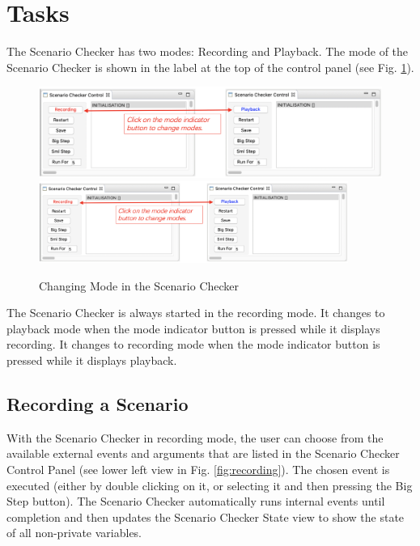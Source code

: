 \section{Tasks}
\label{sec:tasks}

The Scenario Checker has two modes: Recording and Playback. 
The mode of the Scenario Checker is shown in the label at the top of the control panel (see Fig. \ref{fig:changingMode}).

\begin{figure}[!htbp]
	\centering
	\ifplastex
	\includegraphics[width=768]{figures/changingMode}
	\else
	\includegraphics[width=0.9\textwidth]{figures/changingMode}
	\fi
	\caption{Changing Mode in the Scenario Checker}
	\label{fig:changingMode}
\end{figure}


The Scenario Checker is always started in the recording mode.
It changes to playback mode when the mode indicator button is pressed while it displays recording.
It changes to recording mode when the mode indicator button is pressed while it displays playback.

\subsection{Recording a Scenario}
\label{sec:recording}

With the Scenario Checker in recording mode, the user can choose from the available external events and arguments that are listed in the Scenario Checker Control Panel (see lower left view in Fig. \ref{fig:recording}). 
The chosen  event is executed (either by double clicking on it, or selecting it and then pressing the Big Step button).
The Scenario Checker automatically runs internal events until completion and then updates the Scenario Checker State view to show the state of all non-private variables.

